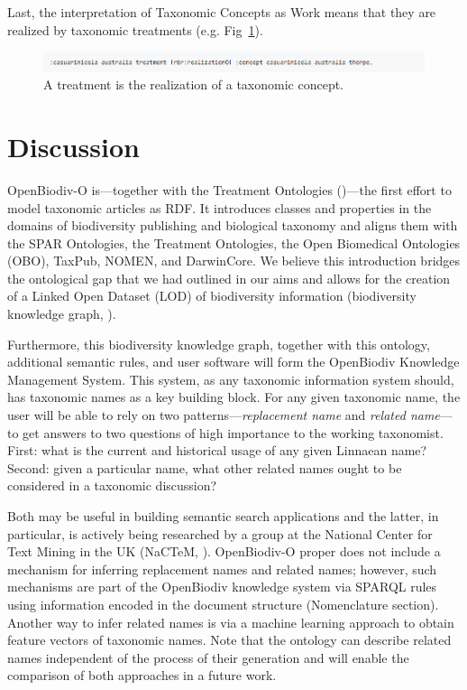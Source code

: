 Last, the interpretation of Taxonomic Concepts as Work means that they are realized by taxonomic treatments (e.g. Fig~\ref{example-treatment-concept}).

\begin{figure}[h!]
\centering
  \includegraphics[width=\textwidth]{Figures/example-treatment-concept}
  \decoRule
  \caption[Example connection between a treatment and a taxonomic concept.]{A treatment is the realization of a taxonomic concept.}
  \label{example-treatment-concept}
\end{figure}

\section{Discussion}

OpenBiodiv-O is---together with the Treatment Ontologies (\cite{catapano_treatment_2016})---the first effort to model taxonomic articles as RDF. It introduces classes and properties in the domains of biodiversity publishing and biological taxonomy and aligns them with the SPAR Ontologies, the Treatment Ontologies, the Open Biomedical Ontologies (OBO), TaxPub, NOMEN, and DarwinCore. We believe this introduction bridges the ontological gap that we had outlined in our aims and allows for the creation of a Linked Open Dataset (LOD) of biodiversity information (biodiversity knowledge graph, \cite{senderov_open_2016, page_towards_2016}).

Furthermore, this biodiversity knowledge graph, together with this ontology, additional semantic rules, and user software will form the OpenBiodiv Knowledge Management System. This system, as any taxonomic information system should, has taxonomic names as a key building block. For any given taxonomic name, the user will be able to rely on two patterns---\emph{replacement name} and \emph{related name}---to get answers to two questions of high importance to the working taxonomist. First: what is the current and historical usage of any given Linnaean name? Second: given a particular name, what other related names ought to be considered in a taxonomic discussion?

Both may be useful in building semantic search applications and the latter, in particular, is actively being researched by a group at the National Center for Text Mining in the UK (NaCTeM, \cite{nguyen_constructing_2017}). \mbox{OpenBiodiv-O} proper does not include a mechanism for inferring replacement names and related names; however, such mechanisms are part of the OpenBiodiv knowledge system via SPARQL rules using information encoded in the document structure (Nomenclature section). Another way to infer related names is via a machine learning approach to obtain feature vectors of taxonomic names.  Note that the ontology can describe related names independent of the process of their generation and will enable the comparison of both approaches in a future work.

